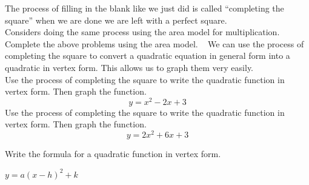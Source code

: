 \documentclass[12pt,fleqn]{book}
\newcommand{\prb}[1]{\begin{Exercise}#1\end{Exercise}}
\newcommand{\sol}[1]{\begin{Answer}#1\end{Answer}}
\begin{document}
The process of filling in the blank like we just did is called ``completing the square'' when we are done we are left with a perfect square.
\\[1em]
Considers doing the same process using the area model for multiplication.  Complete the above problems using the area model.
\clearpage
\
\clearpage
We can use the process of completing the square to convert a quadratic equation in general form into a quadratic in vertex form.  This allows us to graph them very easily.
\\[1em]
Use the process of completing the square to write the quadratic function in vertex form. Then graph the function.
\[y=x^2-2x+3\]
\vfill
Use the process of completing the square to write the quadratic function in vertex form. Then graph the function.
\[y=2x^2+6x+3\]
\vfill
\clearpage
\prb{Write the formula for a quadratic function in vertex form.}
\sol{$y=a(x-h)^2+k$}
\end{document}
